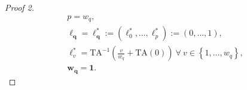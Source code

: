\documentclass[hidelinks, nonatbib]{elsarticle}
\begin{document}
\begin{lemma}
\begin{proof}[Proof 2]
        \begin{gather}
        p = w_q,
        \\
        \boldsymbol{\ell_q} = 
        \boldsymbol{\ell_{q}^{*}}
        :=
        (
            \ell_{0}^{*}
            ,
            \dots
            ,
            \ell_{p}^{*}
        )
        :=
        (
            0
            ,
            \dots
            ,
            1
        )
        ,
        \\
        \ell_{v}^{*}
        =
        \text{TA}^{-1}\left(
            \frac{v}{w_q}
            +
            \text{TA}(0)
        \right)
        \
        \forall
        \
        v \in 
        \left\{
            1, \dots, w_q
        \right\}
        ,
        \\
        \boldsymbol{w_q} =
        \boldsymbol{1}
        .
        \end{gather}    
    \end{proof}
\end{lemma}
\end{document}

